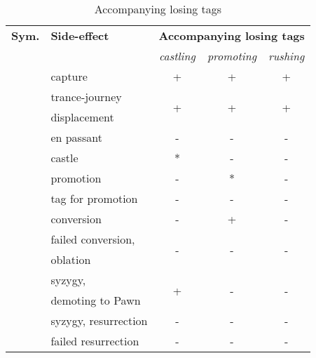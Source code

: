 \begin{table}[!h]
\centering
\begin{tabular}{ rlccc }
\toprule
\textbf{Sym.}               & \textbf{Side-effect}  & \multicolumn{3}{c}{ \textbf{Accompanying losing tags} }              \\ \cmidrule{3-5}
                            &                       & \emph{castling}      & \emph{promoting}      & \emph{rushing}        \\
\midrule
\alg{*}                     & capture               & +                    & +                     & +                     \\ \cmidrule{1-5}
\multirow{2}{*}{\alg{<}}    & trance-journey        & \multirow{2}{*}{+}   & \multirow{2}{*}{+}    & \multirow{2}{*}{+}    \\
                            & displacement          &                      &                       &                       \\ \cmidrule{1-5}
\alg{:}                     & en passant            & -                    & -                     & -                     \\
\alg{\&}                    & castle                & *                    & -                     & -                     \\
\alg{=}                     & promotion             & -                    & *                     & -                     \\
\alg{=}                     & tag for promotion     & -                    & -                     & -                     \\
\alg{\%}                    & conversion            & -                    & +                     & -                     \\ \cmidrule{1-5}
\multirow{2}{*}{\alg{\%\%}} & failed conversion,    & \multirow{2}{*}{-}   & \multirow{2}{*}{-}    & \multirow{2}{*}{-}    \\
                            & oblation              &                      &                       &                       \\ \cmidrule{1-5}
\multirow{2}{*}{\alg{>}}    & syzygy,               & \multirow{2}{*}{+}   & \multirow{2}{*}{-}    & \multirow{2}{*}{-}    \\
                            & demoting to Pawn      &                      &                       &                       \\ \cmidrule{1-5}
\alg{\$}                    & syzygy, resurrection  & -                    & -                     & -                     \\
\alg{\$\$}                  & failed resurrection   & -                    & -                     & -                     \\
\bottomrule
\end{tabular}
\caption{Accompanying losing tags}
\label{tbl:Appendix/Summary/Accompanying-losing-tags}
\end{table}

